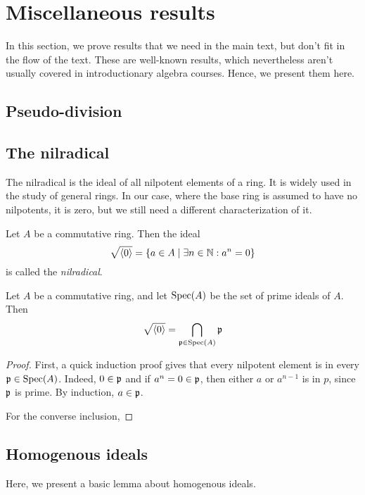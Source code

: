 \section{Miscellaneous results}
In this section, we prove results that we need in the main text, but don't fit in the flow of the text. These are well-known results, which nevertheless aren't usually covered in introductionary algebra courses. Hence, we present them here.

\subsection{Pseudo-division}\label{app:pseudo}


\subsection{The nilradical}
The nilradical is the ideal of all nilpotent elements of a ring. It is widely used in the study of general rings. In our case, where the base ring is assumed to have no nilpotents, it is zero, but we still need a different characterization of it.

\begin{definition}[Nilradical]
  Let $A$ be a commutative ring. Then the ideal \[\sqrt{\langle 0 \rangle} = \{a \in A \mid \exists n \in \mathbb{N} : a^{n} = 0\}\] is called the \textit{nilradical}.
\end{definition}

\begin{theorem}\label{thm:nil_rad_is_cap_primes}
  Let $A$ be a commutative ring, and let $\operatorname{Spec}(A)$ be the set of prime ideals of $A$. Then
  \[\sqrt{\langle 0 \rangle} = \bigcap_{\mathfrak p \in \operatorname{Spec}(A)} \mathfrak p\]
\end{theorem}
\begin{proof}
  First, a quick induction proof gives that every nilpotent element is in every $\mathfrak p \in \operatorname{Spec}(A)$. Indeed, $0 \in \mathfrak p$ and if $a^{n} = 0 \in \mathfrak p$, then either $a$ or $a^{n-1}$ is in $p$, since $\mathfrak p$ is prime. By induction, $a \in \mathfrak p$.

  For the converse inclusion,
\end{proof}




\subsection{Homogenous ideals}

Here, we present a basic lemma about homogenous ideals.

